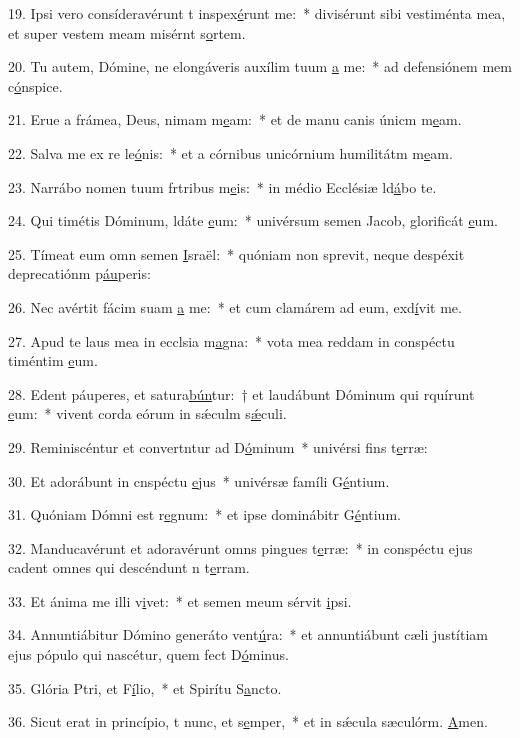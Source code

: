 19. Ipsi vero consíderavérunt t inspex\uline{é}runt me:~* divisérunt sibi vestiménta mea, et super vestem meam misérnt s\uline{o}rtem.\par 
20. Tu autem, Dómine, ne elongáveris auxílim tuum \uline{a} me:~* ad defensiónem mem c\uline{ó}nspice.\par 
21. Erue a frámea, Deus, nimam m\uline{e}am:~* et de manu canis únicm m\uline{e}am.\par 
22. Salva me ex re le\uline{ó}nis:~* et a córnibus unicórnium humilitátm m\uline{e}am.\par 
23. Narrábo nomen tuum frtribus m\uline{e}is:~* in médio Ecclésiæ ld\uline{á}bo te.\par 
24. Qui timétis Dóminum, ldáte \uline{e}um:~* univérsum semen Jacob, glorificát \uline{e}um.\par 
25. Tímeat eum omn semen \uline{I}sraël:~* quóniam non sprevit, neque despéxit deprecatiónm p\uline{áu}peris:\par 
26. Nec avértit fácim suam \uline{a} me:~* et cum clamárem ad eum, exd\uline{í}vit me.\par 
27. Apud te laus mea in ecclsia m\uline{a}gna:~* vota mea reddam in conspéctu timéntim \uline{e}um.\par 
28. Edent páuperes, et satura\uline{bún}tur:~† et laudábunt Dóminum qui rquírunt \uline{e}um:~* vivent corda eórum in sǽculm s\uline{ǽ}culi.\par 
29. Reminiscéntur et convertntur ad D\uline{ó}minum~* univérsi fins t\uline{e}rræ:\par 
30. Et adorábunt in cnspéctu \uline{e}jus~* univérsæ famíli G\uline{é}ntium.\par 
31. Quóniam Dómni est r\uline{e}gnum:~* et ipse dominábitr G\uline{é}ntium.\par 
32. Manducavérunt et adoravérunt omns pingues t\uline{e}rræ:~* in conspéctu ejus cadent omnes qui descéndunt n t\uline{e}rram.\par 
33. Et ánima me illi v\uline{i}vet:~* et semen meum sérvit \uline{i}psi.\par 
34. Annuntiábitur Dómino generáto vent\uline{ú}ra:~* et annuntiábunt cæli justítiam ejus pópulo qui nascétur, quem fect D\uline{ó}minus.\par 
35. Glória Ptri, et F\uline{í}lio,~* et Spirítu S\uline{a}ncto.\par 
36. Sicut erat in princípio, t nunc, et s\uline{e}mper,~* et in sǽcula sæculórm. \uline{A}men.\par 
